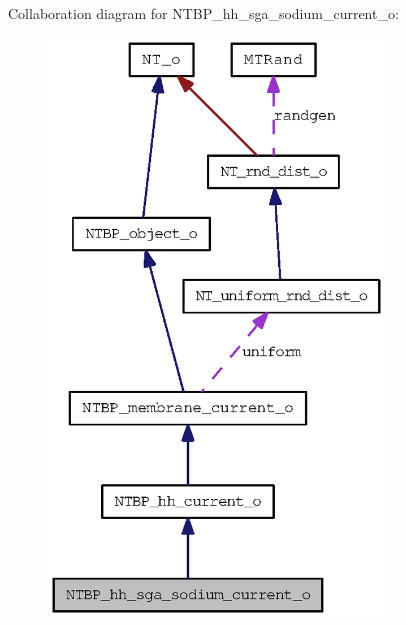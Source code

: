 Collaboration diagram for NTBP\_\-hh\_\-sga\_\-sodium\_\-current\_\-o:
\nopagebreak
\begin{figure}[H]
\begin{center}
\leavevmode
\includegraphics[width=253pt]{class_n_t_b_p__hh__sga__sodium__current__o__coll__graph}
\end{center}
\end{figure}
